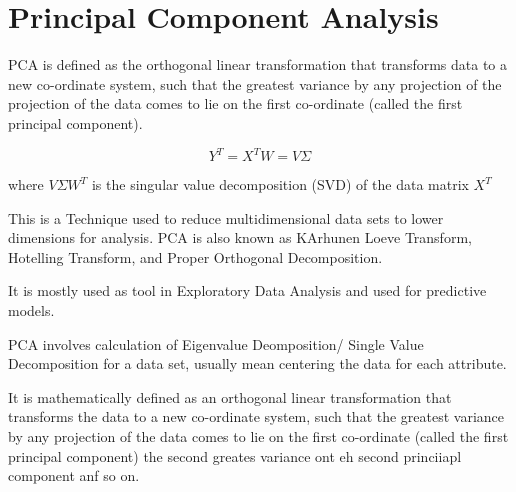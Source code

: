 \section{Principal Component Analysis}
PCA is defined as the orthogonal linear transformation that transforms data to a new co-ordinate system, such that the greatest variance by any projection
of the projection of the data comes to lie on the first co-ordinate (called the first principal component).

\[ Y^{T} = X^{T}W = V \Sigma \]

where $V \Sigma W^{T}$ is the singular value decomposition (SVD) of the data matrix $X^{T}$


This is a Technique used to reduce multidimensional data sets to lower dimensions for analysis.
PCA is also known as KArhunen Loeve Transform, Hotelling Transform, and Proper Orthogonal Decomposition.

It is mostly used as tool in Exploratory Data Analysis and used for predictive models.

PCA involves calculation of Eigenvalue Deomposition/ Single Value Decomposition for a data set, usually mean centering the data for each attribute.

It is mathematically defined as an orthogonal linear transformation that transforms the data to a new co-ordinate system, such that the greatest variance
by any projection of the data comes to lie on the first co-ordinate (called the first principal component) the second greates variance ont eh second princiiapl component anf so on. 

